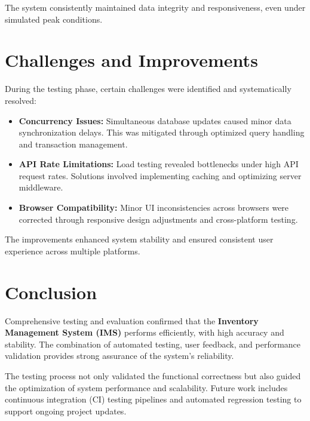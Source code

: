 \documentclass[12pt,a4paper]{article}
\begin{document}
The system consistently maintained data integrity and responsiveness, even under simulated peak conditions.

\section{Challenges and Improvements}
During the testing phase, certain challenges were identified and systematically resolved:
\begin{itemize}
    \item \textbf{Concurrency Issues:} Simultaneous database updates caused minor data synchronization delays. This was mitigated through optimized query handling and transaction management.
    \item \textbf{API Rate Limitations:} Load testing revealed bottlenecks under high API request rates. Solutions involved implementing caching and optimizing server middleware.
    \item \textbf{Browser Compatibility:} Minor UI inconsistencies across browsers were corrected through responsive design adjustments and cross-platform testing.
\end{itemize}

The improvements enhanced system stability and ensured consistent user experience across multiple platforms.

\section{Conclusion}
Comprehensive testing and evaluation confirmed that the \textbf{Inventory Management System (IMS)} performs efficiently, with high accuracy and stability. The combination of automated testing, user feedback, and performance validation provides strong assurance of the system’s reliability.

The testing process not only validated the functional correctness but also guided the optimization of system performance and scalability. Future work includes continuous integration (CI) testing pipelines and automated regression testing to support ongoing project updates.
\end{document}
